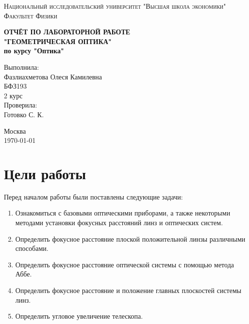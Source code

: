 \documentclass[a4paper, 12pt]{article}
\begin{document}
\begin{titlepage}
\begin{center}
\textsc{Национальный исследовательский университет "Высшая школа экономики"\\[5mm]
Факультет Физики}

\vfill

\textbf{ОТЧЁТ ПО ЛАБОРАТОРНОЙ РАБОТЕ \\[3mm]
"ГЕОМЕТРИЧЕСКАЯ ОПТИКА"\\[3mm]
по курсу "Оптика"
\\[20mm]
}
\end{center}

\hfill
\begin{minipage}{.5\textwidth}
Выполнила:\\[2mm] 
Фазлиахметова Олеся Камилевна\\
БФЗ193\\
2 курс\\[5mm]

Проверила:\\[2mm] 
Готовко С. К. 
\end{minipage}%
\vfill
\begin{center}
 Москва\\
 \today
\end{center}
\end{titlepage}



\tableofcontents

\newpage

\section{Цели работы}

Перед началом работы были поставлены следующие задачи:

\begin{enumerate}
	
	\item Ознакомиться с базовыми оптическими приборами, а также некоторыми методами установки фокусных расстояний линз и оптических систем. 
	
	\item Определить фокусное расстояние плоской положительной линзы различными способами.
	
	\item Определить фокусное расстояние оптической системы с помощью метода Аббе.
	
	\item Определить фокусное расстояние и положение главных плоскостей системы линз.
	
	\item Определить угловое увеличение телескопа.
\end{enumerate}
\end{document}
